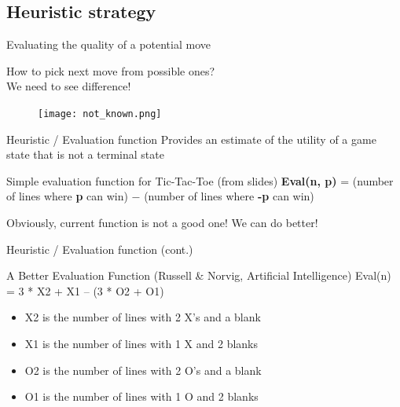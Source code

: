 \documentclass[aspectratio=169]{beamer}
\begin{document}
\subsection{Heuristic strategy}

\begin{frame}{Evaluating the quality of a potential move}

How to pick next move from possible ones? \\
We need to see difference! 
\begin{figure}
	\texttt{[image: not\_known.png]}	
\end{figure}
\end{frame}

\begin{frame}{Heuristic / Evaluation function}
Provides an estimate of the utility of a game state that is
not a terminal state
\begin{block}{Simple evaluation function for Tic-Tac-Toe (from slides)}
\textbf{Eval(n, p)} = (number of lines where \textbf{p} can win) $-$ (number of lines where \textbf{-p} can win)
\end{block}

\pause
 Obviously, current function is not a good one! We can do better!
\end{frame}



\begin{frame}{Heuristic / Evaluation function (cont.)}

\begin{block}{A Better Evaluation Function   (Russell \& Norvig, Artificial Intelligence)}
Eval(n) = 3 * X2 + X1 – (3 * O2 + O1) \\

\begin{itemize}
 \item X2 is the number of lines with 2 X’s and a blank
 \item X1 is the number of lines with 1 X and 2 blanks
 \item O2 is the number of lines with 2 O’s and a blank
 \item O1 is the number of lines with 1 O and 2 blanks 
\end{itemize}

\end{block}

\end{frame}
\end{document}
